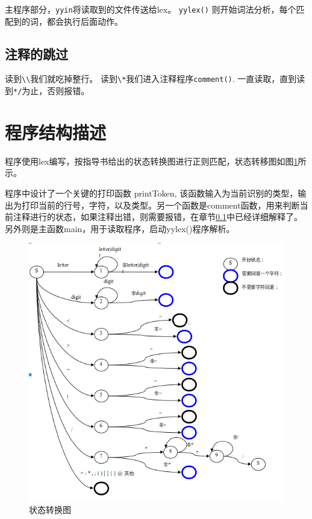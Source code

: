 \documentclass{article}
\begin{document}
\begin{CJK}{UTF8}{gkai}
主程序部分，\verb|yyin|将读取到的文件传送给lex。 \verb|yylex()| 则开始词法分析，每个匹配到的词，都会执行后面动作。\cite{levine1992lex}\cite{lesk1975lex}
\subsection{注释的跳过}\label{sec:com}
读到\verb|\\|我们就吃掉整行。
读到\verb|\*|我们进入注释程序\verb|comment()|. 一直读取，直到读到\verb|*/|为止，否则报错。

\section{程序结构描述}
程序使用lex编写，按指导书给出的状态转换图进行正则匹配，状态转移图如图\ref{fig:state}所示。

程序中设计了一个关键的打印函数 printToken, 该函数输入为当前识别的类型，输出为打印当前的行号，字符，以及类型。另一个函数是comment函数，用来判断当前注释进行的状态，如果注释出错，则需要报错，在章节\ref{sec:com}中已经详细解释了。另外则是主函数main，用于读取程序，启动yylex()程序解析。
\begin{figure}[!h]
\includegraphics[width=\linewidth]{lex}
\caption{状态转换图}
\label{fig:state}
\end{figure}



\end{CJK}
\end{document}
